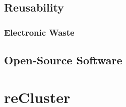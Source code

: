 \subsection{Reusability}
\label{subsec:introduction_context_reusability}

\subsubsection{Electronic Waste}
\label{subsubsec:introduction_context_reusability_electronic_waste}

\subsection{Open-Source Software}
\label{subsubsec:introduction_context_reusability_open_source_software}

\section{reCluster}
\label{sec:introduction_recluster}

